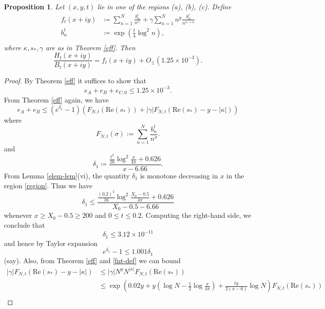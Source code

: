 \documentclass[a4paper,11pt,twoside]{amsart}
\newtheorem{proposition}[theorem]{Proposition}
\begin{document}
\begin{proposition}\label{sweep}  Let $(x,y,t)$ lie in one of the regions (a), (b), (c).
Define
\begin{align*}
f_t(x+iy) &\coloneqq \sum_{n=1}^N \frac{b_n^t}{n^{s_*}} + \gamma \sum_{n=1}^N n^y \frac{b_n^t}{n^{\overline{s_*} + \kappa}}\\
b_n^t &\coloneqq \exp( \frac{t}{4} \log^2 n),\\
\end{align*}
where $\kappa, s_*, \gamma$ are as in Theorem \ref{eff}.  Then
\begin{equation}\label{bbb}
\frac{H_t(x+iy)}{B_t(x+iy)} = f_t(x+iy) + O_{\leq}( 1.25 \times 10^{-3} ).
\end{equation}
\end{proposition}

\begin{proof} 
By Theorem \ref{eff} it suffices to show that
$$ e_A + e_B + e_{C,0} \leq 1.25 \times 10^{-3}.$$
From Theorem \ref{eff} again, we have
\begin{equation}\label{eaeb-bound}
 e_A + e_B \leq (e^{\delta_1}-1) (F_{N,t}(\mathrm{Re}(s_*)) + |\gamma| F_{N,t}( \mathrm{Re}(s_*) - y - |\kappa| ) )
\end{equation}
where
\begin{equation}\label{fnt-def}
 F_{N,t}( \sigma ) := \sum_{n=1}^N \frac{b_n^t}{n^\sigma}.
\end{equation}
and
\begin{equation}\label{dela}
 \delta_1 \coloneqq \frac{\frac{t^2}{16} \log^2 \frac{x}{4\pi} + 0.626}{x-6.66}.
\end{equation}
From Lemma \ref{elem-lem}(vi), the quantity $\delta_1$ is monotone decreasing in $x$ in the region \eqref{region}.  Thus we have
\begin{equation}\label{delta1-bound}
 \delta_1 \leq \frac{\frac{(0.2)^2}{16} \log^2 \frac{X_0-0.5}{4\pi} + 0.626}{X_0-0.5-6.66}
\end{equation}
whenever $x \geq X_0-0.5 \geq 200$ and $0 \leq t \leq 0.2$.  Computing the right-hand side, we conclude that
$$  \delta_1 \leq 3.12 \times 10^{-11}$$
and hence by Taylor expansion
$$ e^{\delta_1} - 1 \leq 1.001 \delta_1$$
(say).
Also, from Theorem \ref{eff} and \eqref{fnt-def} we can bound
\begin{align*}
|\gamma| F_{N,t}( \mathrm{Re}(s_*) - y - |\kappa| ) &\leq |\gamma| N^y N^{|\kappa|} F_{N,t}( \mathrm{Re}(s_*) ) \\
&\leq \exp\left( 0.02 y + y \left(\log N - \frac{1}{2} \log \frac{x}{4\pi}\right) + \frac{ty}{2(x-6)} \log N \right) F_{N,t}( \mathrm{Re}(s_*) )  \\

\end{align*}
\end{proof}
\end{document}
